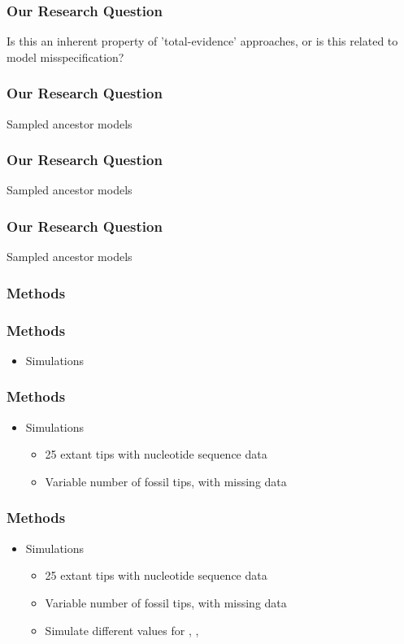 \documentclass[]{beamer}
\begin{document}
\begin{frame}
\frametitle{Our Research Question}
Is this an inherent property of 'total-evidence' approaches, or is this related to model misspecification?
\end{frame}

\begin{frame}
\frametitle{Our Research Question}
Sampled ancestor models
\end{frame}

\begin{frame}
\frametitle{Our Research Question}
Sampled ancestor models
\end{frame}

\begin{frame}
\frametitle{Our Research Question}
Sampled ancestor models
\end{frame}

\begin{frame}
\frametitle{Methods}
\end{frame}

\begin{frame}
\frametitle{Methods}
\begin{itemize}
\item Simulations
\end{itemize}
\end{frame}

\begin{frame}
\frametitle{Methods}
\begin{itemize}
\item Simulations
\begin{itemize}
\item 25 extant tips with nucleotide sequence data
\item Variable number of fossil tips, with missing data
\end{itemize}
\end{itemize}
\end{frame}

\begin{frame}
\frametitle{Methods}
\begin{itemize}
\item Simulations
\begin{itemize}
\item 25 extant tips with nucleotide sequence data
\item Variable number of fossil tips, with missing data
\item Simulate different values for \lambda, \mu ,  \psi
\end{itemize}
\end{itemize}
\end{frame}
\end{document}
